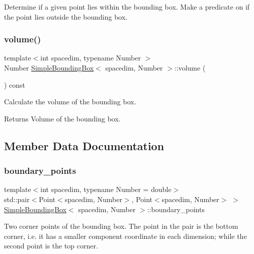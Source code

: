 Determine if a given point lies within the bounding box. Make a predicate on if the point lies outside the bounding box.\mbox{\label{classSimpleBoundingBox_a44340fd2ab10e9c05c1a88719958fee5}} 
\subsubsection{\texorpdfstring{volume()}{volume()}}
{\footnotesize\ttfamily template$<$int spacedim, typename Number $>$ \\
Number \hyperlink{classSimpleBoundingBox}{Simple\+Bounding\+Box}$<$ spacedim, Number $>$\+::volume (\begin{DoxyParamCaption}{ }\end{DoxyParamCaption}) const}

Calculate the volume of the bounding box. \begin{DoxyReturn}{Returns}
Volume of the bounding box. 
\end{DoxyReturn}


\subsection{Member Data Documentation}
\mbox{\label{classSimpleBoundingBox_a066f18179d514c16ac68baa5ebd85ba5}} 
\subsubsection{\texorpdfstring{boundary\+\_\+points}{boundary\_points}}
{\footnotesize\ttfamily template$<$int spacedim, typename Number = double$>$ \\
std\+::pair$<$Point$<$spacedim, Number$>$, Point$<$spacedim, Number$>$ $>$ \hyperlink{classSimpleBoundingBox}{Simple\+Bounding\+Box}$<$ spacedim, Number $>$\+::boundary\+\_\+points\hspace{0.3cm}{\ttfamily [private]}}

Two corner points of the bounding box. The point in the pair is the bottom corner, i.\+e. it has a smaller component coordinate in each dimension; while the second point is the top corner. 

